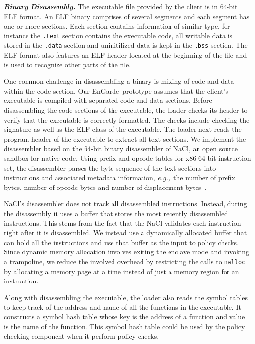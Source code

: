 \documentclass[conference,compsoc]{IEEEtran}
\newcommand{\myparagraph}[1]{\parskip -4pt \indent\par\noindent\textbf{\textit{#1}} \parskip 0pt}
\newcommand{\code}[1]{{\tt \footnotesize #1}}
\newcommand{\eg}{\textit{e.g.,}\xspace}
\newcommand{\tool}{EnGarde\xspace} %
\begin{document}
\myparagraph{Binary Disassembly.} The executable file provided by the client is
in 64-bit ELF format.  An ELF binary comprises of several segments and each
segment has one or more sections. Each section contains information of similar
type, for instance the \code{.text} section contains the executable code, all
writable data is stored in the \code{.data} section and uninitilized data is
kept in the \code{.bss} section. The ELF format also features an ELF header
located at the beginning of the file and is used to recognize other parts of
the file.

One common challenge in disassembling a binary is mixing of code and data
within the code section. Our \tool\ prototype assumes that the client's
executable is compiled with separated code and data sections. Before
disassembling the code sections of the executable, the loader checks its header
to verify that the executable is correctly formatted. The checks include
checking the signature as well as the ELF class of the executable. The loader
next reads the program header of the executable to extract all text sections.
We implement the disassembler based on the 64-bit binary disassembler of NaCl,
an open source sandbox for native code. Using prefix and opcode tables for
x86-64 bit instruction set, the disassembler parses the byte sequence of the
text sections into instructions and associated metadata
information, \eg~the number of prefix bytes, number of opcode bytes and number
of displacement bytes~\cite{intelinstructionset:june16}.

NaCl's disassembler  does not track all disassembled instructions. Instead,
during the disassembly it uses a buffer that stores the most recently
disassembled instructions. This stems from the fact that the NaCl validates
each instruction right after it is disassembled.  We instead use a dynamically
allocated buffer that can hold all the instructions and use that buffer as the
input to policy checks. Since dynamic memory allocation involves exiting the
enclave mode and invoking a trampoline, we reduce the involved overhead by
restricting the calls to \code{malloc} by allocating a memory page at a time
instead of just a memory region for an instruction.

Along with disassembling the executable, the loader also reads the symbol
tables to keep track of the address and name of all the functions in the
executable. It constructs a symbol hash table whose key is the address of a
function and value is the name of the function. This symbol hash table could be
used by the policy checking component when it perform policy checks.
\end{document}
